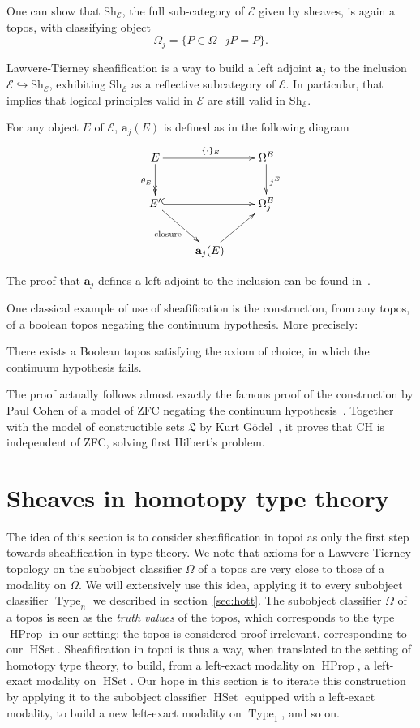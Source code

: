 \documentclass[notfinal]{jfrarticle}
\DeclareMathOperator{\Type}{Type}
\DeclareMathOperator{\HProp}{HProp}
\DeclareMathOperator{\HSet}{HSet}
\newcommand \Sh[1] {\mathrm{Sh}_{#1}}
\begin{document}
One can show that $\Sh{\mathcal E}$, the full sub-category of
$\mathcal E$ given by
sheaves, is again a topos, with classifying object
%
\[
\Omega_j = \{ P \in \Omega \ | \ j P  = P \}.
\]

Lawvere-Tierney sheafification is a way to build a left adjoint $\mathbf{a}_j$ to the
inclusion $\mathcal E \hookrightarrow \Sh{\mathcal E}$, exhibiting
$\Sh{\mathcal E}$ as a reflective subcategory of $\mathcal E$. In
particular, that implies that logical principles valid in $\mathcal E$
are still valid in $\Sh{\mathcal E}$.

For any object $E$ of $\mathcal E$, $\mathbf{a}_j(E)$ is defined as in
the following diagram
\[
  \xymatrix{ 
    E \ar[rr]^{\{\cdot\}_E} \ar@{->>}[d]_{\theta_E} && \Omega^E \ar[d]^{j^E}\\
    E' \ar@{^{(}->}[rr] \ar[dr]_{\text{closure}} && \Omega_j^E \\
    & \mathbf{a}_j(E) \ar[ur]&
  }
\]

The proof that $\mathbf a_j$ defines a left adjoint to the inclusion
can be found in~\cite{maclanemoerdijk}.

One classical example of use of sheafification is the construction,
from any topos, of a boolean topos negating the continuum
hypothesis. More precisely:

\begin{thm}
  There exists a Boolean topos satisfying the axiom of choice, in
  which the continuum hypothesis fails.
\end{thm}

The proof actually follows almost exactly the famous proof of the
construction by Paul Cohen of a model of ZFC negating the continuum
hypothesis~\cite{cohen1966}. Together with the model of constructible
sets $\mathfrak L$ by Kurt Gödel~\cite{godel40}, it proves that CH is
independent of ZFC, solving first Hilbert's problem.

\section{Sheaves in homotopy type theory}
\label{sec:sheaf_hott}

The idea of this section is to consider sheafification in topoi as
only the first step towards sheafification in type theory. 
We note that axioms for a Lawvere-Tierney topology on the subobject
classifier $\Omega$ of a topos are very close to
those of a modality on $\Omega$. We will extensively use this idea,
applying it to every subobject classifier $\Type_n$ we described
in section~\ref{sec:hott}. The subobject
classifier $\Omega$ of a topos is seen as the {\em truth values} of the
topos, which corresponds to the type $\HProp$ in our setting; the
topos is considered proof irrelevant, corresponding to our
$\HSet$. Sheafification in topoi is thus a way, when translated to the
setting of homotopy type theory, to build, from a left-exact modality on
$\HProp$, a left-exact modality on $\HSet$. Our hope in this section
is to iterate this construction by applying it to the subobject
classifier $\HSet$ equipped with a left-exact modality, to build a new
left-exact modality on $\Type_1$, and so on. 
\end{document}
